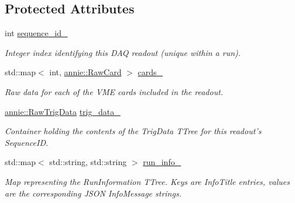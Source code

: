 \subsection*{Protected Attributes}
\begin{DoxyCompactItemize}
\item 
\hypertarget{classannie_1_1RawReadout_a68ba25af6d505d9d7e9d01af34412d56}{
int \hyperlink{classannie_1_1RawReadout_a68ba25af6d505d9d7e9d01af34412d56}{sequence\_\-id\_\-}}
\label{classannie_1_1RawReadout_a68ba25af6d505d9d7e9d01af34412d56}

\begin{DoxyCompactList}\small\item\em Integer index identifying this DAQ readout (unique within a run). \item\end{DoxyCompactList}\item 
std::map$<$ int, \hyperlink{classannie_1_1RawCard}{annie::RawCard} $>$ \hyperlink{classannie_1_1RawReadout_a7326e38c87830bfc38205850fa557d8c}{cards\_\-}
\begin{DoxyCompactList}\small\item\em Raw data for each of the VME cards included in the readout. \item\end{DoxyCompactList}\item 
\hypertarget{classannie_1_1RawReadout_ab1dd18ba980aa34a73ea07d936381568}{
\hyperlink{classannie_1_1RawTrigData}{annie::RawTrigData} \hyperlink{classannie_1_1RawReadout_ab1dd18ba980aa34a73ea07d936381568}{trig\_\-data\_\-}}
\label{classannie_1_1RawReadout_ab1dd18ba980aa34a73ea07d936381568}

\begin{DoxyCompactList}\small\item\em Container holding the contents of the TrigData TTree for this readout's SequenceID. \item\end{DoxyCompactList}\item 
\hypertarget{classannie_1_1RawReadout_a0ee4f30909504cc831781b32ed3c5026}{
std::map$<$ std::string, std::string $>$ \hyperlink{classannie_1_1RawReadout_a0ee4f30909504cc831781b32ed3c5026}{run\_\-info\_\-}}
\label{classannie_1_1RawReadout_a0ee4f30909504cc831781b32ed3c5026}

\begin{DoxyCompactList}\small\item\em Map representing the RunInformation TTree. Keys are InfoTitle entries, values are the corresponding JSON InfoMessage strings. \item\end{DoxyCompactList}\end{DoxyCompactItemize}


